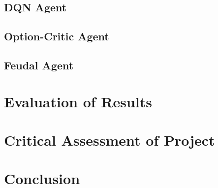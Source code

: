 \documentclass[notitlepage,a4paper,11pt]{article}
\begin{document}
\subsection{DQN Agent}

\subsection{Option-Critic Agent}

\subsection{Feudal Agent}

\section{Evaluation of Results}

\section{Critical Assessment of Project}

\section{Conclusion}

\pagebreak



\end{document}
